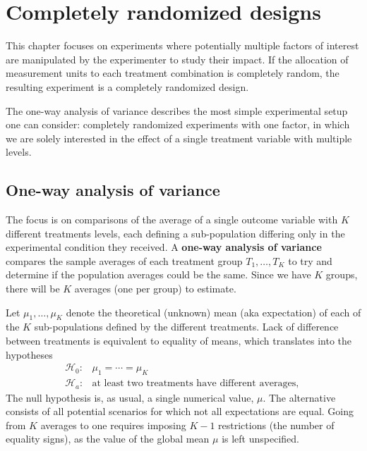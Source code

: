 \documentclass[
  11pt,
  letterpaper,
]{scrbook}
\theoremstyle{definition}
\theoremstyle{definition}
\theoremstyle{remark}
\begin{document}

\chapter{Completely randomized designs}\label{CRT}

This chapter focuses on experiments where potentially multiple factors
of interest are manipulated by the experimenter to study their impact.
If the allocation of measurement units to each treatment combination is
completely random, the resulting experiment is a completely randomized
design.

The one-way analysis of variance describes the most simple experimental
setup one can consider: completely randomized experiments with one
factor, in which we are solely interested in the effect of a single
treatment variable with multiple levels.

\section{One-way analysis of
variance}\label{one-way-analysis-of-variance}

The focus is on comparisons of the average of a single outcome variable
with \(K\) different treatments levels, each defining a sub-population
differing only in the experimental condition they received. A
\textbf{one-way analysis of variance} compares the sample averages of
each treatment group \(T_1, \ldots, T_K\) to try and determine if the
population averages could be the same. Since we have \(K\) groups, there
will be \(K\) averages (one per group) to estimate.

Let \(\mu_1, \ldots, \mu_K\) denote the theoretical (unknown) mean (aka
expectation) of each of the \(K\) sub-populations defined by the
different treatments. Lack of difference between treatments is
equivalent to equality of means, which translates into the hypotheses
\begin{align*}
\mathscr{H}_0: & \mu_1 = \cdots = \mu_K \\
\mathscr{H}_a: & \text{at least two treatments have different averages, }
\end{align*} The null hypothesis is, as usual, a single numerical value,
\(\mu\). The alternative consists of all potential scenarios for which
not all expectations are equal. Going from \(K\) averages to one
requires imposing \(K-1\) restrictions (the number of equality signs),
as the value of the global mean \(\mu\) is left unspecified.
\end{document}
